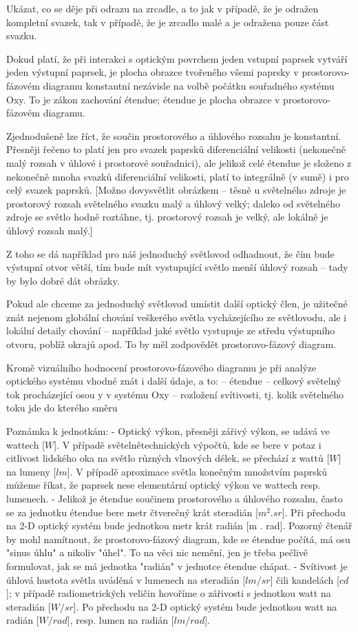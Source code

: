 Ukázat, co se děje při odrazu na zrcadle, a to jak v případě, že je
odražen kompletní svazek, tak v případě, že je zrcadlo malé a je
odražena pouze část svazku.

Dokud platí, že při interakci s optickým povrchem jeden vstupní paprsek
vytváří jeden výstupní paprsek, je plocha obrazce tvořeného všemi
paprsky v prostorovo-fázovém diagramu konstantní nezávisle na volbě
počátku souřadného systému Oxy. To je zákon zachování étendue; étendue
je plocha obrazce v prostorovo-fázovém diagramu.

Zjednodušeně lze říct, že součin prostorového a úhlového rozsahu je
konstantní. Přesněji řečeno to platí jen pro svazek paprsků
diferenciální velikosti (nekonečně malý rozsah v úhlové i prostorové
souřadnici), ale jelikož celé étendue je složeno z nekonečně mnoha
svazků diferenciální velikosti, platí to integrálně (v sumě) i pro celý
svazek paprsků. [Možno dovysvětlit obrázkem -- těsně u světelného zdroje
je prostorový rozsah světelného svazku malý a úhlový velký; daleko od
světelného zdroje se světlo hodně roztáhne, tj. prostorový rozsah je
velký, ale lokálně je úhlový rozsah malý.]

Z toho se dá například pro náš jednoduchý světlovod odhadnout, že čím
bude výstupní otvor větší, tím bude mít vystupující světlo menší úhlový
rozsah -- tady by bylo dobré dát obrázky.

Pokud ale chceme za jednoduchý světlovod umístit další optický člen, je
užitečné znát nejenom globální chování veškerého světla vycházejícího ze
světlovodu, ale i lokální detaily chování -- například jaké světlo
vystupuje ze středu výstupního otvoru, poblíž okrajů apod. To by měl
zodpovědět prostorovo-fázový diagram.

Kromě vizuálního hodnocení prostorovo-fázového diagramu je při analýze
optického systému vhodné znát i další údaje, a to:
-- étendue
-- celkový světelný tok procházející osou y v systému Oxy
-- rozložení svítivosti, tj. kolik světelného toku jde do kterého směru

Poznámka k jednotkám:
- Optický výkon, přesněji zářivý výkon, se udává ve wattech [$W$]. V
případě světelnětechnických výpočtů, kde se bere v potaz i citlivost
lidského oka na světlo různých vlnových délek, se přechází z wattů [$W$]
na lumeny [$lm$]. V případě aproximace světla konečným množstvím paprsků
můžeme říkat, že paprsek nese elementární optický výkon ve wattech resp.
lumenech.
- Jelikož je étendue součinem prostorového a úhlového rozsahu, často se
za jednotku étendue bere metr čtverečný krát steradián [$m^2 . sr$]. Při
přechodu na 2-D optický systém bude jednotkou metr krát radián [m . rad].
Pozorný čtenář by mohl namítnout, že prostorovo-fázový diagram,
kde se étendue počítá, má osu "sinus úhlu" a nikoliv "úhel". To na věci
nic nemění, jen je třeba pečlivě formulovat, jak se má jednotka "radián"
v jednotce étendue chápat.
- Svítivost je úhlová hustota světla uváděná v lumenech na steradián
[$lm/sr$] čili kandelách [$cd$]; v případě radiometrických veličin hovoříme
o zářivosti s jednotkou watt na steradián [$W/sr$]. Po přechodu na 2-D
optický systém bude jednotkou watt na radián [$W/rad$], resp. lumen na
radián [$lm/rad$].

